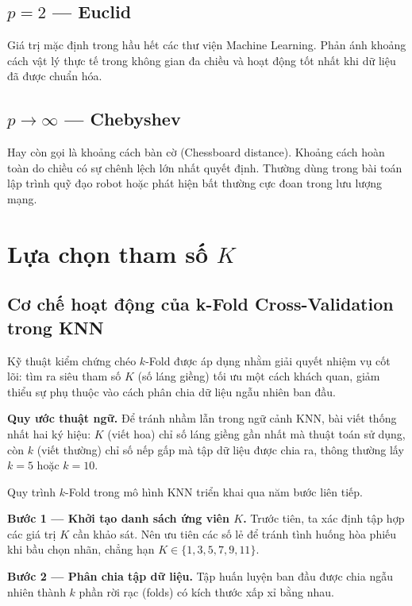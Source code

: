 \documentclass[12pt,a4paper]{article}
\begin{document}
\subsection{$p = 2$ — Euclid}

Giá trị mặc định trong hầu hết các thư viện Machine Learning. Phản ánh khoảng cách vật lý thực tế trong không gian đa chiều và hoạt động tốt nhất khi dữ liệu đã được chuẩn hóa.

\subsection{$p \to \infty$ — Chebyshev}

Hay còn gọi là khoảng cách bàn cờ (Chessboard distance). Khoảng cách hoàn toàn do chiều có sự chênh lệch lớn nhất quyết định. Thường dùng trong bài toán lập trình quỹ đạo robot hoặc phát hiện bất thường cực đoan trong lưu lượng mạng.

\section{Lựa chọn tham số $K$}
\subsection{Cơ chế hoạt động của k-Fold Cross-Validation trong KNN}

Kỹ thuật kiểm chứng chéo $k$-Fold được áp dụng nhằm giải quyết nhiệm vụ
cốt lõi: tìm ra siêu tham số $K$ (số láng giềng) tối ưu một cách khách
quan, giảm thiểu sự phụ thuộc vào cách phân chia dữ liệu ngẫu nhiên
ban đầu.

\textbf{Quy ước thuật ngữ.} Để tránh nhầm lẫn trong ngữ cảnh KNN, bài
viết thống nhất hai ký hiệu: $K$ (viết hoa) chỉ số láng giềng gần nhất
mà thuật toán sử dụng, còn $k$ (viết thường) chỉ số nếp gấp mà tập dữ
liệu được chia ra, thông thường lấy $k = 5$ hoặc $k = 10$.

Quy trình $k$-Fold trong mô hình KNN triển khai qua năm bước liên tiếp.

\textbf{Bước 1 — Khởi tạo danh sách ứng viên $K$.} Trước tiên, ta xác
định tập hợp các giá trị $K$ cần khảo sát. Nên ưu tiên các số lẻ để
tránh tình huống hòa phiếu khi bầu chọn nhãn, chẳng hạn
$K \in \{1, 3, 5, 7, 9, 11\}$.

\textbf{Bước 2 — Phân chia tập dữ liệu.} Tập huấn luyện ban đầu được
chia ngẫu nhiên thành $k$ phần rời rạc (folds) có kích thước xấp xỉ
bằng nhau.
\end{document}
